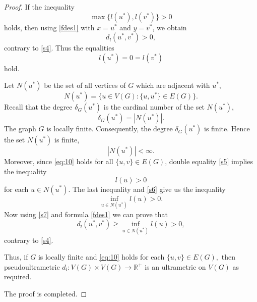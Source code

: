 \documentclass[10pt,a4paper]{amsart}
\begin{document}
\begin{proof}
If the inequality
\[
\max\{l(u^*),l(v^*)\}>0
\]
holds, then using \eqref{fdes1} with \( x=u^*\) and \( y=v^* \), we obtain
\[
d_l(u^*,v^*)>0,
\]
contrary to \eqref{s4}. Thus the equalities 
\begin{equation}
    \label{s5}
l(u^*)=0=l(v^*)
\end{equation}
hold.

Let \( N(u^*) \) be the set of all vertices of \( G \) which are adjacent with \( u^* \),
\[
N(u^*)=\{u\in V(G): \{u,u^*\}\in E(G)\}.
\]
Recall that the degree \( \delta_G(u^*) \) is the cardinal number of the set \( N(u^*) \),
\[
\delta_G(u^*)=|N(u^*)|.
\]
The graph \( G \) is locally finite. Consequently, the degree $\delta_G(u^*)$ is finite. Hence the set \( N(u^*) \) is finite,
\begin{equation}
    \label{s6}
|N(u^*)|<\infty.
\end{equation}
Moreover, since \eqref{eq:10} holds for all \( \{u,v\}\in E(G) \), double equality \eqref{s5} implies the inequality 
\[ 
l(u)>0 
\] 
for each \( u\in N(u^*) \).
The last inequality and \eqref{s6} give us the inequality
\begin{equation}
    \label{s7}
\inf_{u\in N(u^*)} l(u) > 0.
\end{equation}
Now using \eqref{s7} and formula \eqref{fdes1} we can prove that
\[
d_l(u^*,v^*) \ge \inf_{u\in N(u^*)} l(u) > 0,
\]
contrary to \eqref{s4}. 

Thus, if $G$ is locally finite and \eqref{eq:10} holds for each $\{u,v\}\in E(G),$ then pseudoultrametric \( d_l: V(G)\times V(G)\to \mathbb{R}^+ \) is an ultrametric on \( V(G) \) as required.

The proof is completed.
\end{proof}
\end{document}
